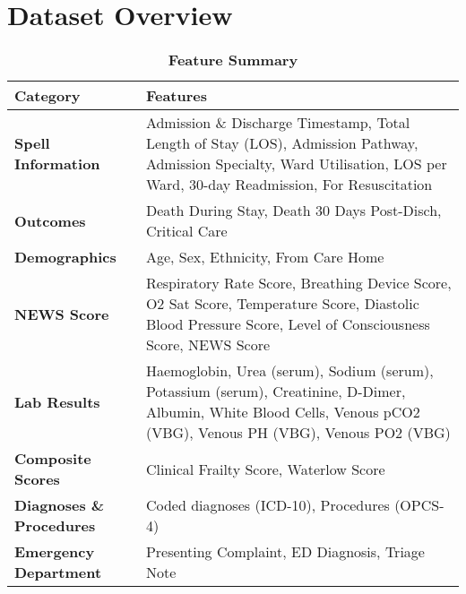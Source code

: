 \documentclass[hf]{ceurart}
\begin{document}
\section{Dataset Overview}
\captionsetup[table]{labelformat=empty}
\begin{table}[htbp]
\renewcommand{\arraystretch}{1.2}
\centering
\caption{\textbf{Feature Summary}}
\begin{tabular}{l p{9cm}}
\toprule
\textbf{Category} & \textbf{Features} \\
\midrule
\textbf{Spell Information} & Admission \& Discharge Timestamp, Total Length of Stay (LOS), Admission Pathway, Admission Specialty, Ward Utilisation, LOS per Ward, 30-day Readmission, For Resuscitation\\
\textbf{Outcomes} & Death During Stay, Death 30 Days Post-Disch, Critical Care \\
\textbf{Demographics} & Age, Sex, Ethnicity, From Care Home \\
\textbf{NEWS Score} & Respiratory Rate Score, Breathing Device Score, O2 Sat Score, Temperature Score,  Diastolic Blood Pressure Score, Level of Consciousness Score, NEWS Score \\
\textbf{Lab Results} & Haemoglobin, Urea (serum), Sodium (serum), Potassium (serum), Creatinine, D-Dimer, Albumin, White Blood Cells, Venous pCO2 (VBG), Venous PH (VBG), Venous PO2 (VBG)\\
\textbf{Composite Scores} & Clinical Frailty Score, Waterlow Score\\
\textbf{Diagnoses \& Procedures} & Coded diagnoses (ICD-10), Procedures (OPCS-4) \\
\textbf{Emergency Department} & Presenting Complaint, ED Diagnosis, Triage Note\\
\bottomrule
\end{tabular}
\end{table}
\end{document}

